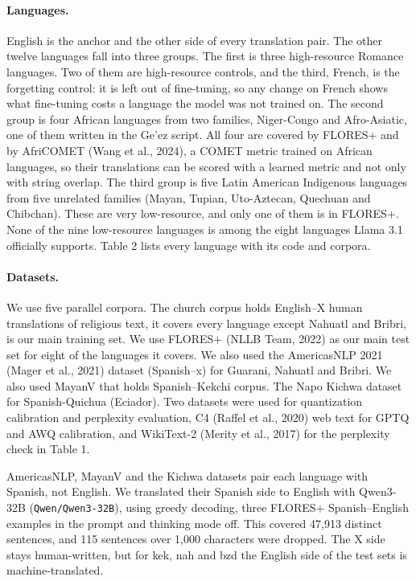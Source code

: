 \documentclass[11pt]{article}
\begin{document}
\paragraph{Languages.} English is the anchor and the other side of every translation pair. The other twelve languages fall into three groups. The first is three high-resource Romance languages. Two of them are high-resource controls, and the third, French, is the forgetting control: it is left out of fine-tuning, so any change on French shows what fine-tuning costs a language the model was not trained on. The second group is four African languages from two families, Niger-Congo and Afro-Asiatic, one of them written in the Ge'ez script. All four are covered by FLORES+ and by AfriCOMET (Wang et al., 2024), a COMET metric trained on African languages, so their translations can be scored with a learned metric and not only with string overlap. The third group is five Latin American Indigenous languages from five unrelated families (Mayan, Tupian, Uto-Aztecan, Quechuan and Chibchan). These are very low-resource, and only one of them is in FLORES+. None of the nine low-resource languages is among the eight languages Llama 3.1 officially supports. Table 2 lists every language with its code and corpora.

\paragraph{Datasets.} We use five parallel corpora. The church corpus holds English–X human translations of religious text, it covers every language except Nahuatl and Bribri, is our main training set. We use FLORES+ (NLLB Team, 2022) as our main test set for eight of the languages it covers. We also used the AmericasNLP 2021 (Mager et al., 2021) dataset (Spanish–x) for Guarani, Nahuatl and Bribri. We also used MayanV that holds Spanish–Kekchi corpus. The Napo Kichwa dataset for Spanish-Quichua (Eciador). Two datasets were used for quantization calibration and perplexity evaluation, C4 (Raffel et al., 2020) web text for GPTQ and AWQ calibration, and WikiText-2 (Merity et al., 2017) for the perplexity check in Table 1.

AmericasNLP, MayanV and the Kichwa datasets pair each language with Spanish, not English. We translated their Spanish side to English with Qwen3-32B (\nolinkurl{Qwen/Qwen3-32B}), using greedy decoding, three FLORES+ Spanish–English examples in the prompt and thinking mode off. This covered 47,913 distinct sentences, and 115 sentences over 1,000 characters were dropped. The X side stays human-written, but for kek, nah and bzd the English side of the test sets is machine-translated.
\end{document}
